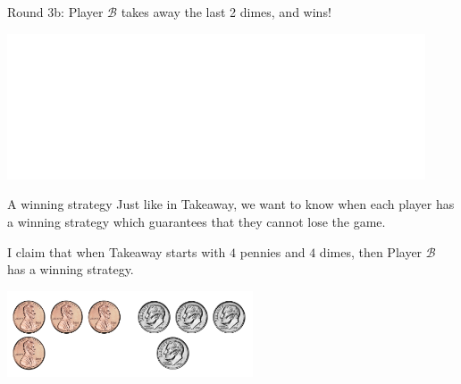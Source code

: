 \documentclass{beamer}
\theoremstyle{theorem}
\theoremstyle{definition}
\newcommand{\<}{\langle}
\renewcommand{\>}{\rangle}
\newcommand{\pl}[1]{\mathscr{#1}}
\newcommand{\vpause}{\pause\vspace{1em}}
\begin{document}
\begin{frame}
  Round 3b: Player $\pl B$ takes away the last 2 dimes, and wins!

  \centerline{
    \includegraphics[height=1.7in]{nimCoins/00.pdf}
  }
\end{frame}

\begin{frame}{A winning strategy}
  Just like in Takeaway, we want to know when each player has a winning
  strategy which guarantees that they cannot lose the game.

  \vpause

  I claim that when Takeaway starts with $4$ pennies and $4$ dimes, then Player
  $\pl B$ has a winning strategy.

  \centerline{
    \includegraphics[height=1in]{nimCoins/44.pdf}
  }
\end{frame}
\end{document}
